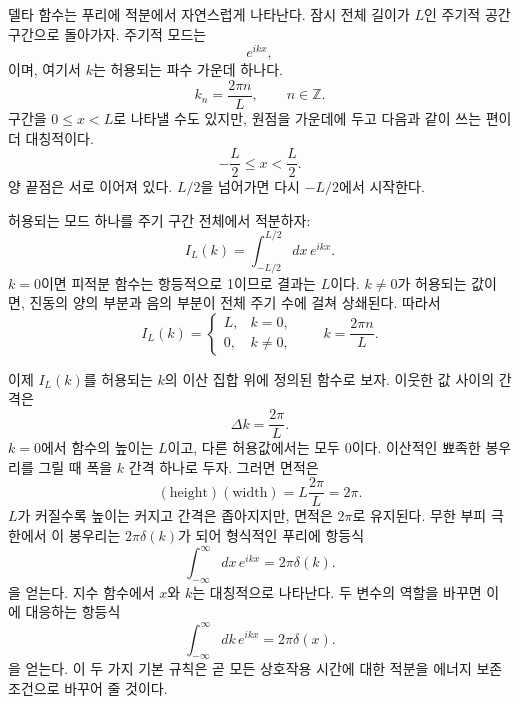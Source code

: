 델타 함수는 푸리에 적분에서 자연스럽게 나타난다. 잠시 전체 길이가 \(L\)인 주기적 공간 구간으로 돌아가자. 주기적 모드는
\begin{equation}
e^{ikx},
\end{equation}
이며, 여기서 \(k\)는 허용되는 파수 가운데 하나다.
\begin{equation}
k_n=\frac{2\pi n}{L},
\qquad n\in\mathbb Z.
\end{equation}
구간을 \(0\leq x<L\)로 나타낼 수도 있지만, 원점을 가운데에 두고 다음과 같이 쓰는 편이 더 대칭적이다.
\begin{equation}
-\frac L2\leq x<\frac L2.
\end{equation}
양 끝점은 서로 이어져 있다. \(L/2\)을 넘어가면 다시 \(-L/2\)에서 시작한다.

허용되는 모드 하나를 주기 구간 전체에서 적분하자:
\begin{equation}
I_L(k)=\int_{-L/2}^{L/2}dx\,e^{ikx}.
\end{equation}
\(k=0\)이면 피적분 함수는 항등적으로 1이므로 결과는 \(L\)이다. \(k\neq0\)가 허용되는 값이면, 진동의 양의 부분과 음의 부분이 전체 주기 수에 걸쳐 상쇄된다. 따라서
\begin{equation}
I_L(k)=
\begin{cases}
L,&k=0,\\[4pt]
0,&k\neq0,
\end{cases}
\qquad
k=\frac{2\pi n}{L}.
\end{equation}

이제 \(I_L(k)\)를 허용되는 \(k\)의 이산 집합 위에 정의된 함수로 보자. 이웃한 값 사이의 간격은
\begin{equation}
\Delta k=\frac{2\pi}{L}.
\end{equation}
\(k=0\)에서 함수의 높이는 \(L\)이고, 다른 허용값에서는 모두 0이다. 이산적인 뾰족한 봉우리를 그릴 때 폭을 \(k\) 간격 하나로 두자. 그러면 면적은
\begin{equation}
(\text{height})(\text{width})
=L\frac{2\pi}{L}=2\pi.
\end{equation}
\(L\)가 커질수록 높이는 커지고 간격은 좁아지지만, 면적은 \(2\pi\)로 유지된다. 무한 부피 극한에서 이 봉우리는 \(2\pi\delta(k)\)가 되어 형식적인 푸리에 항등식
\begin{equation}
\int_{-\infty}^{\infty}dx\,e^{ikx}=2\pi\delta(k).
\end{equation}
을 얻는다. 지수 함수에서 \(x\)와 \(k\)는 대칭적으로 나타난다. 두 변수의 역할을 바꾸면 이에 대응하는 항등식
\begin{equation}
\int_{-\infty}^{\infty}dk\,e^{ikx}=2\pi\delta(x).
\end{equation}
을 얻는다. 이 두 가지 기본 규칙은 곧 모든 상호작용 시간에 대한 적분을 에너지 보존 조건으로 바꾸어 줄 것이다.

